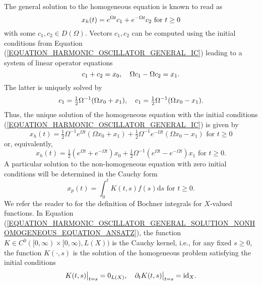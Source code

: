 \documentclass[12pt]{article}
\numberwithin{equation}{section}
\numberwithin{equation}{section}
\begin{document}
	The general solution to the homogeneous equation is known to read as
	\begin{equation}
		x_{h}(t) = e^{\Omega t} c_{1} + e^{-\Omega t} c_{2} \text{ for } t \geq 0 \notag
	\end{equation}
	with some $c_{1}, c_{2} \in D(\Omega)$.
	Vectors $c_{1}, c_{2}$ can be computed using the initial conditions from Equation (\ref{EQUATION_HARMONIC_OSCILLATOR_GENERAL_IC}) 
	leading to a system of linear operator equations
	\begin{equation}
		c_{1} + c_{2} = x_{0}, \quad \Omega c_{1} - \Omega c_{2} = x_{1}. \notag
	\end{equation}
	The latter is uniquely solved by
	\begin{equation}
		c_{1} = \tfrac{1}{2} \Omega^{-1} (\Omega x_{0} + x_{1}), \quad c_{1} = \tfrac{1}{2} \Omega^{-1} (\Omega x_{0} - x_{1}). \notag
	\end{equation}
	Thus, the unique solution of the homogeneous equation with the initial conditions (\ref{EQUATION_HARMONIC_OSCILLATOR_GENERAL_IC}) is given by
	\begin{equation}
		x_{h}(t) = \tfrac{1}{2} \Omega^{-1} e^{\Omega t} (\Omega x_{0} + x_{1}) + \tfrac{1}{2} \Omega^{-1} e^{-\Omega t} (\Omega x_{0} - x_{1})
		\text{ for } t \geq 0
	\end{equation}
	or, equivalently,
	\begin{equation}
		x_{h}(t) = \tfrac{1}{2} (e^{\Omega t} + e^{-\Omega t}) x_{0} + \tfrac{1}{2} \Omega^{-1} (e^{\Omega t} - e^{-\Omega t}) x_{1}
		\text{ for } t \geq 0.
		\label{EQUATION_HARMONIC_OSCILLATOR_GENERAL_SOLUTION_HOMOGENEOUS_EQUATION}
	\end{equation}
	A particular solution to the non-homogeneous equation with zero initial conditions will be determined in the Cauchy form
	\begin{equation}
		x_{p}(t) = \int_{0}^{t} K(t, s) f(s) \mathrm{d}s \text{ for } t \geq 0.
		\label{EQUATION_HARMONIC_OSCILLATOR_GENERAL_SOLUTION_NONHOMOGENEOUS_EQUATION_ANSATZ}
	\end{equation}
	We refer the reader to \cite[Chapter 1]{ArBaHieNeu2001} for the definition of Bochner integrals for $X$-valued functions.
	In Equation (\ref{EQUATION_HARMONIC_OSCILLATOR_GENERAL_SOLUTION_NONHOMOGENEOUS_EQUATION_ANSATZ}),
	the function $K \in C^{0}([0, \infty) \times [0, \infty), L(X))$ is the Cauchy kernel, i.e., 
	for any fixed $s \geq 0$, the function $K(\cdot, s)$ is the solution of the homogeneous problem satisfying the initial conditions
	\begin{equation}
		K(t, s)\big|_{t = s} = 0_{L(X)}, \quad
		\partial_{t} K(t, s)\big|_{t = s} = \mathrm{id}_{X}. \notag
	\end{equation}
\end{document}
